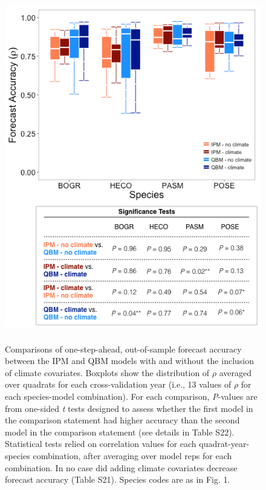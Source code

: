 \documentclass[12pt,]{article}
\begin{document}
\begin{figure}[!ht]
  \centering
      \includegraphics[height=6in]{./components/forecast_accuracy_mockup_boxplot.png}
  \caption{Comparisons of one-step-ahead, out-of-sample forecast accuracy between the IPM and QBM models with and without the inclusion of climate covariates. Boxplots show the distribution of $\rho$ averaged over quadrats for each cross-validation year (i.e., 13 values of $\rho$ for each species-model combination). For each comparison, \emph{P}-values are from one-sided \emph{t} tests designed to assess whether the first model in the comparison statement had higher accuracy than the second model in the comparison statement (see details in Table S22). Statistical tests relied on correlation values for each quadrat-year-species combination, after averaging over model reps for each combination. In no case did adding climate covariates decrease forecast accuracy (Table S21). Species codes are as in Fig. 1.}
\end{figure}

\newpage{}
\end{document}
